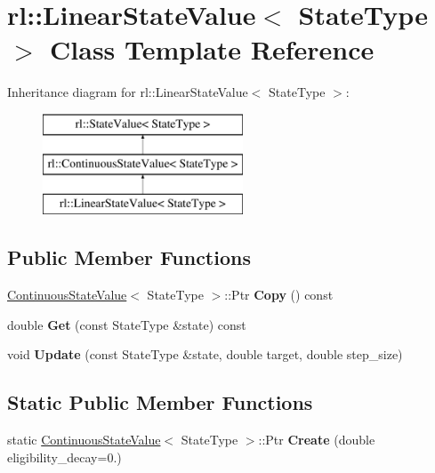 \hypertarget{classrl_1_1_linear_state_value}{}\section{rl\+:\+:Linear\+State\+Value$<$ State\+Type $>$ Class Template Reference}
\label{classrl_1_1_linear_state_value}
Inheritance diagram for rl\+:\+:Linear\+State\+Value$<$ State\+Type $>$\+:\begin{figure}[H]
\begin{center}
\leavevmode
\includegraphics[height=3.000000cm]{classrl_1_1_linear_state_value}
\end{center}
\end{figure}
\subsection*{Public Member Functions}
\begin{DoxyCompactItemize}
\item 
\hypertarget{classrl_1_1_linear_state_value_a376e6ef5a0eff32e723740459914afb3}{}\label{classrl_1_1_linear_state_value_a376e6ef5a0eff32e723740459914afb3} 
\hyperlink{structrl_1_1_continuous_state_value}{Continuous\+State\+Value}$<$ State\+Type $>$\+::Ptr {\bfseries Copy} () const
\item 
\hypertarget{classrl_1_1_linear_state_value_a5c8b861db63f2d9a9183b20f85be8512}{}\label{classrl_1_1_linear_state_value_a5c8b861db63f2d9a9183b20f85be8512} 
double {\bfseries Get} (const State\+Type \&state) const
\item 
\hypertarget{classrl_1_1_linear_state_value_a49cd9b3fb94e07068da4067858761146}{}\label{classrl_1_1_linear_state_value_a49cd9b3fb94e07068da4067858761146} 
void {\bfseries Update} (const State\+Type \&state, double target, double step\+\_\+size)
\end{DoxyCompactItemize}
\subsection*{Static Public Member Functions}
\begin{DoxyCompactItemize}
\item 
\hypertarget{classrl_1_1_linear_state_value_a3d507ee49c75ebd3faf8e56a603797dc}{}\label{classrl_1_1_linear_state_value_a3d507ee49c75ebd3faf8e56a603797dc} 
static \hyperlink{structrl_1_1_continuous_state_value}{Continuous\+State\+Value}$<$ State\+Type $>$\+::Ptr {\bfseries Create} (double eligibility\+\_\+decay=0.)
\end{DoxyCompactItemize}
